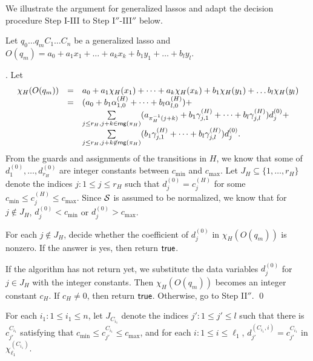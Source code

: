 \begin{appendix}
We illustrate the argument for generalized lassos and adapt the decision procedure Step I-III to Step I$''$-III$''$ below.

Let $q_0 \dots q_m C_1 \dots C_n$ be a generalized lasso and $O(q_m)=a_0 + a_1 x_1 + \dots + a_k x_k + b_1 y_1 + \dots + b_l y_l$.

\smallskip

. Let
\[
\begin{array}{l c l }
\chi_H(O(q_m)) & = & a_0 + a_1 \chi_H(x_1) + \dots + a_k \chi_H(x_k) + b_1 \chi_H(y_1) + \dots b_l \chi_H(y_l) \\
& = & (a_0+b_1 \alpha^{(H)}_{1,0} + \dots + b_l \alpha^{(H)}_{l,0}) + \\
& & \sum \limits_{j \le r_H, j+k \in \mathsf{rng}(\pi_H)} (a_{\pi_H^{-1}(j+k)}+ b_1 \gamma^{(H)}_{j,1}+\dots + b_l \gamma^{(H)}_{j,l}) d^{(0)}_j +
\\
& & \sum \limits_{j \le r_H, j +k \not \in \mathsf{rng}(\pi_H)}  (b_1 \gamma^{(H)}_{j,1}+\dots + b_l \gamma^{(H)}_{j,l}) d^{(0)}_j .
\end{array}
\]
From the guards and assignments of the transitions in $H$, we know that some of $d^{(0)}_1,\dots,d^{(0)}_{r_H}$ are integer constants between $c_{\min}$ and $c_{\max}$. Let $J_H \subseteq \{1,\dots, r_H\}$ denote the indices $j: 1 \le j \le r_H$ such that $d^{(0)}_j = c^{(H)}_j$ for some $c_{\min}\le c^{(H)}_j \le c_{\max}$. Since ${\mathcal{S} }$ is assumed to be normalized, we know that for $j \not \in J_H$,  $d^{(0)}_j < c_{\min}$ or $d^{(0)}_j > c_{\max}$.

For each $j \not \in J_H$, decide whether the coefficient of $d^{(0)}_j$ in $\chi_H(O(q_m))$ is nonzero. If the answer is yes, then return $\mathsf{true}$. 

If the algorithm has not return yet, we substitute the data variables $d^{(0)}_j$ for $j \in J_H$ with the integer constants. Then $\chi_H(O(q_m))$ becomes an integer constant $c_H$. If $c_H \neq 0$, then return $\mathsf{true}$.  Otherwise, go to Step II$''$. \qed

\medskip

For each $i_1: 1 \le i_1 \le n$, let $J_{C_{i_1}}$ denote the indices $j': 1 \le j' \le l$ such that there is $c^{C_{i_1}}_{j'}$ satisfying that $c_{\min} \le c^{C_{i_1}}_{j'} \le c_{\max}$, and for each $i: 1 \le i \le \ell_1$, $d^{(C_{i_1},i)}_{j'}=c^{C_{i_1}}_{j'}$ in $\chi^{(C_{i_1})}_{\ell_1}$. 


\end{appendix}
